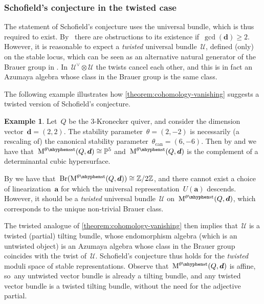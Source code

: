 \documentclass[11pt]{article}
\theoremstyle{plain}
\theoremstyle{definition}
\newtheorem{example}[theorem]{Example}
\DeclareMathOperator\Br{Br}
\newcommand\can{\ensuremath{\mathrm{can}}}
\newcommand\moduli{\ensuremath{\mathrm{M}}}
\newcommand\semistable{\ensuremath{\mhyphen\mathrm{sst}}}
\newcommand\stable{\ensuremath{\mhyphen\mathrm{st}}}
\newcommand\tuple[1]{\ensuremath{{\boldsymbol{#1}}}}
\begin{document}
\subsubsection*{Schofield's conjecture in the twisted case}
The statement of Schofield's conjecture uses the universal bundle,
which is thus required to exist. By~\cite[Th.\,4.4]{MR3683503} there are obstructions to its existence
if~$\gcd(\tuple{d})\geq 2$.
However, it is reasonable to expect a \emph{twisted} universal bundle~$\mathcal{U}$,
defined (only) on the stable locus,
which can be seen as an alternative natural generator of the Brauer group in \cite[Conj.\,4.3]{MR3683503}.
In~$\mathcal{U}^\vee\otimes\mathcal{U}$ the twists cancel each other,
and this is in fact an Azumaya algebra whose class in the Brauer group is the same class.

The following example illustrates how \cref{theorem:cohomology-vanishing}
suggests a twisted version of Schofield's conjecture.

\begin{example}
\label{example:twisted-schofield}
Let~$Q$ be the $3$-Kronecker quiver,
and consider the dimension vector~$\tuple{d}=(2,2)$.
The stability parameter~$\theta=(2,-2)$ is necessarily
(a rescaling of) the canonical stability parameter~$\theta_\can=(6,-6)$.
Then by \cite[p.\,1779]{MR1972892}
and \cite[\S7]{MR3683503} we have that~$\moduli^{\theta\semistable}(Q,\tuple{d})\cong\mathbb{P}^5$
and~$\moduli^{\theta\stable}(Q,\tuple{d})$ is the complement of a determinantal cubic hypersurface.

By \cite[Prop.\,7.1]{MR3683503} we have that~$\Br(\moduli^{\theta\stable}(Q,\tuple{d}))\cong\mathbb{Z}/2\mathbb{Z}$,
and there cannot exist a choice of linearization~$\tuple{a}$
for which the universal representation~$U(\tuple{a})$ descends.
However, it should be a \emph{twisted} universal bundle~$\mathcal{U}$ on~$\moduli^{\theta\stable}(Q,\tuple{d})$,
which corresponds to the unique non-trivial Brauer class.

The twisted analogue of \cref{theorem:cohomology-vanishing}
then implies that~$\mathcal{U}$ is a twisted (partial) tilting bundle,
whose endomorphism algebra (which is an untwisted object)
is an Azumaya algebra whose class in the Brauer group coincides with the twist of~$\mathcal{U}$.
Schofield's conjecture thus holds for the \emph{twisted} moduli space of stable representations.
Observe that~$\moduli^{\theta\stable}(Q,\tuple{d})$ is affine, so~any untwisted vector bundle is already a tilting bundle,
and any twisted vector bundle is a twisted tilting bundle,
without the need for the adjective partial.
\end{example}
\end{document}
